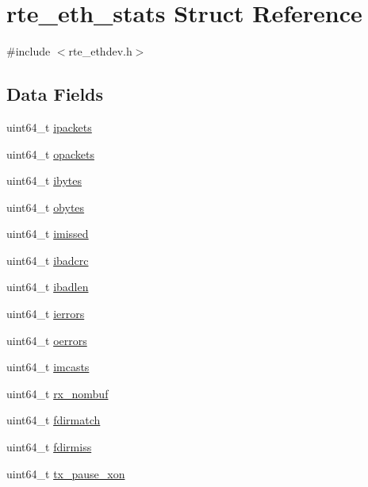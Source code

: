 \hypertarget{structrte__eth__stats}{}\section{rte\+\_\+eth\+\_\+stats Struct Reference}
\label{structrte__eth__stats}


{\ttfamily \#include $<$rte\+\_\+ethdev.\+h$>$}

\subsection*{Data Fields}
\begin{DoxyCompactItemize}
\item 
uint64\+\_\+t \hyperlink{structrte__eth__stats_ac14b69830000494630c8897b70c5fc54}{ipackets}
\item 
uint64\+\_\+t \hyperlink{structrte__eth__stats_a6e7706a96b1ff8a262652a554b4823b2}{opackets}
\item 
uint64\+\_\+t \hyperlink{structrte__eth__stats_a90c25a10d1e2ab583f03f6c5237563c0}{ibytes}
\item 
uint64\+\_\+t \hyperlink{structrte__eth__stats_a4874ce812696c16cf79997be5cd7ef1a}{obytes}
\item 
uint64\+\_\+t \hyperlink{structrte__eth__stats_a462703bfeca72b2d1039f588d8ddbf3c}{imissed}
\item 
uint64\+\_\+t \hyperlink{structrte__eth__stats_adc177fe8dee01846d6381f0a7a7682c6}{ibadcrc}
\item 
uint64\+\_\+t \hyperlink{structrte__eth__stats_a90fbfb9c0b092c4bfa5be8ee0b1808dc}{ibadlen}
\item 
uint64\+\_\+t \hyperlink{structrte__eth__stats_aa4f59b58c69cf6d99f2bdfcad48c5774}{ierrors}
\item 
uint64\+\_\+t \hyperlink{structrte__eth__stats_aef4fb99e61e169cf6fc62b61f5bd5035}{oerrors}
\item 
uint64\+\_\+t \hyperlink{structrte__eth__stats_a9cb6910614279200341f56d2a2ec03cb}{imcasts}
\item 
uint64\+\_\+t \hyperlink{structrte__eth__stats_a8afc3f87397701e58b218d9dad03be8c}{rx\+\_\+nombuf}
\item 
uint64\+\_\+t \hyperlink{structrte__eth__stats_abf92854ce27eb061859a43ba737ea58b}{fdirmatch}
\item 
uint64\+\_\+t \hyperlink{structrte__eth__stats_ad74169688c2ec4ef03a6805a8f30b9ff}{fdirmiss}
\item 
uint64\+\_\+t \hyperlink{structrte__eth__stats_a9a059300921a0a35c16dbf64e8861ced}{tx\+\_\+pause\+\_\+xon}

\end{DoxyCompactItemize}

